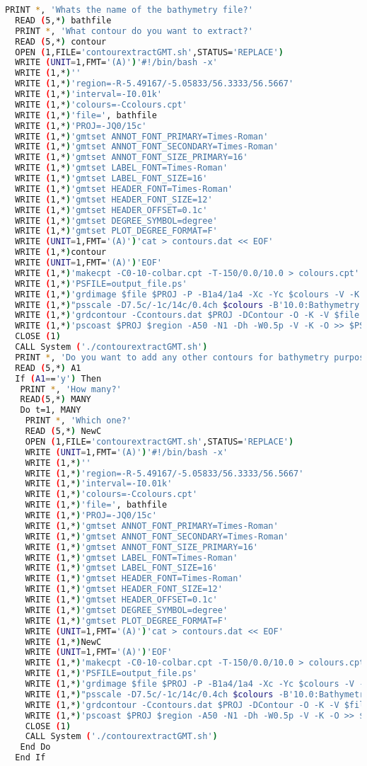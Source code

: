 \begin{lstlisting}[language = Bash]
  PRINT *, 'Whats the name of the bathymetry file?'
  READ (5,*) bathfile
  PRINT *, 'What contour do you want to extract?'
  READ (5,*) contour
  OPEN (1,FILE='contourextractGMT.sh',STATUS='REPLACE')
  WRITE (UNIT=1,FMT='(A)')'#!/bin/bash -x'
  WRITE (1,*)''
  WRITE (1,*)'region=-R-5.49167/-5.05833/56.3333/56.5667'
  WRITE (1,*)'interval=-I0.01k'
  WRITE (1,*)'colours=-Ccolours.cpt'
  WRITE (1,*)'file=', bathfile
  WRITE (1,*)'PROJ=-JQ0/15c'
  WRITE (1,*)'gmtset ANNOT_FONT_PRIMARY=Times-Roman'
  WRITE (1,*)'gmtset ANNOT_FONT_SECONDARY=Times-Roman'
  WRITE (1,*)'gmtset ANNOT_FONT_SIZE_PRIMARY=16'
  WRITE (1,*)'gmtset LABEL_FONT=Times-Roman'
  WRITE (1,*)'gmtset LABEL_FONT_SIZE=16'
  WRITE (1,*)'gmtset HEADER_FONT=Times-Roman'
  WRITE (1,*)'gmtset HEADER_FONT_SIZE=12'
  WRITE (1,*)'gmtset HEADER_OFFSET=0.1c'
  WRITE (1,*)'gmtset DEGREE_SYMBOL=degree'
  WRITE (1,*)'gmtset PLOT_DEGREE_FORMAT=F'
  WRITE (UNIT=1,FMT='(A)')'cat > contours.dat << EOF'
  WRITE (1,*)contour
  WRITE (UNIT=1,FMT='(A)')'EOF'
  WRITE (1,*)'makecpt -C0-10-colbar.cpt -T-150/0.0/10.0 > colours.cpt'
  WRITE (1,*)'PSFILE=output_file.ps'
  WRITE (1,*)'grdimage $file $PROJ -P -B1a4/1a4 -Xc -Yc $colours -V -K > $PSFILE'
  WRITE (1,*)"psscale -D7.5c/-1c/14c/0.4ch $colours -B'10.0:Bathymetry:' -K -O -V >> $PSFILE"
  WRITE (1,*)'grdcontour -Ccontours.dat $PROJ -DContour -O -K -V $file >> $PSFILE'
  WRITE (1,*)'pscoast $PROJ $region -A50 -N1 -Dh -W0.5p -V -K -O >> $PSFILE'
  CLOSE (1)
  CALL System ('./contourextractGMT.sh')
  PRINT *, 'Do you want to add any other contours for bathymetry purposes (y/n)?'
  READ (5,*) A1
  If (A1=='y') Then
   PRINT *, 'How many?'
   READ(5,*) MANY
   Do t=1, MANY
    PRINT *, 'Which one?'
    READ (5,*) NewC
    OPEN (1,FILE='contourextractGMT.sh',STATUS='REPLACE')
    WRITE (UNIT=1,FMT='(A)')'#!/bin/bash -x'
    WRITE (1,*)''
    WRITE (1,*)'region=-R-5.49167/-5.05833/56.3333/56.5667'
    WRITE (1,*)'interval=-I0.01k'
    WRITE (1,*)'colours=-Ccolours.cpt'
    WRITE (1,*)'file=', bathfile
    WRITE (1,*)'PROJ=-JQ0/15c'
    WRITE (1,*)'gmtset ANNOT_FONT_PRIMARY=Times-Roman'
    WRITE (1,*)'gmtset ANNOT_FONT_SECONDARY=Times-Roman'
    WRITE (1,*)'gmtset ANNOT_FONT_SIZE_PRIMARY=16'
    WRITE (1,*)'gmtset LABEL_FONT=Times-Roman'
    WRITE (1,*)'gmtset LABEL_FONT_SIZE=16'
    WRITE (1,*)'gmtset HEADER_FONT=Times-Roman'
    WRITE (1,*)'gmtset HEADER_FONT_SIZE=12'
    WRITE (1,*)'gmtset HEADER_OFFSET=0.1c'
    WRITE (1,*)'gmtset DEGREE_SYMBOL=degree'
    WRITE (1,*)'gmtset PLOT_DEGREE_FORMAT=F'
    WRITE (UNIT=1,FMT='(A)')'cat > contours.dat << EOF'
    WRITE (1,*)NewC
    WRITE (UNIT=1,FMT='(A)')'EOF'
    WRITE (1,*)'makecpt -C0-10-colbar.cpt -T-150/0.0/10.0 > colours.cpt'
    WRITE (1,*)'PSFILE=output_file.ps'
    WRITE (1,*)'grdimage $file $PROJ -P -B1a4/1a4 -Xc -Yc $colours -V -K > $PSFILE'
    WRITE (1,*)"psscale -D7.5c/-1c/14c/0.4ch $colours -B'10.0:Bathymetry:' -K -O -V >> $PSFILE"
    WRITE (1,*)'grdcontour -Ccontours.dat $PROJ -DContour -O -K -V $file >> $PSFILE'
    WRITE (1,*)'pscoast $PROJ $region -A50 -N1 -Dh -W0.5p -V -K -O >> $PSFILE'
    CLOSE (1)
    CALL System ('./contourextractGMT.sh')
   End Do
  End If


\end{lstlisting}
